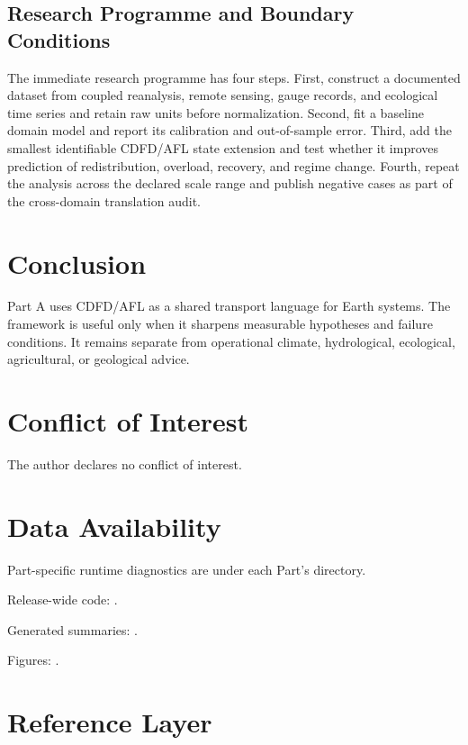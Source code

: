 \documentclass[12pt,a4paper]{article}
\begin{document}
\subsection{Research Programme and Boundary Conditions}

The immediate research programme has four steps. First, construct a documented
dataset from coupled reanalysis, remote sensing, gauge records, and ecological time series and retain raw units before normalization.
Second, fit a baseline domain model and report its calibration and out-of-sample
error. Third, add the smallest identifiable CDFD/AFL state extension and test
whether it improves prediction of redistribution, overload, recovery, and regime change. Fourth, repeat the
analysis across the declared scale range and publish negative cases as part of
the cross-domain translation audit.


\section{Conclusion}

Part A uses CDFD/AFL as a shared transport language for Earth systems. The
framework is useful only when it sharpens measurable hypotheses and failure
conditions. It remains separate from operational climate, hydrological,
ecological, agricultural, or geological advice.

\section*{Conflict of Interest}
The author declares no conflict of interest.

\section*{Data Availability}
Part-specific runtime diagnostics are under each Part's  directory.

Release-wide code: .

Generated summaries: .

Figures: .


\section{Reference Layer}


\end{document}
